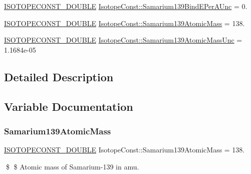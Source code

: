 \begin{DoxyCompactItemize}
\mbox{\hyperlink{group___isotope_const-_macros_ga8f45a7272ce02c0b4c65c44636ed719a}{I\+S\+O\+T\+O\+P\+E\+C\+O\+N\+S\+T\+\_\+\+D\+O\+U\+B\+LE}} \mbox{\hyperlink{group___isotope_const-_samarium-_sm139_gaa7116a8a73ff18141a5881150bd939eb}{Isotope\+Const\+::\+Samarium139\+Bind\+E\+Per\+A\+Unc}} = 0.
\item 
\mbox{\hyperlink{group___isotope_const-_macros_ga8f45a7272ce02c0b4c65c44636ed719a}{I\+S\+O\+T\+O\+P\+E\+C\+O\+N\+S\+T\+\_\+\+D\+O\+U\+B\+LE}} \mbox{\hyperlink{group___isotope_const-_samarium-_sm139_ga582a691def134e676c5132adc0b16564}{Isotope\+Const\+::\+Samarium139\+Atomic\+Mass}} = 138.
\item 
\mbox{\hyperlink{group___isotope_const-_macros_ga8f45a7272ce02c0b4c65c44636ed719a}{I\+S\+O\+T\+O\+P\+E\+C\+O\+N\+S\+T\+\_\+\+D\+O\+U\+B\+LE}} \mbox{\hyperlink{group___isotope_const-_samarium-_sm139_ga39a2565d2235af0a1166a1ebedc75ff8}{Isotope\+Const\+::\+Samarium139\+Atomic\+Mass\+Unc}} = 1.\+1684e-\/05
\end{DoxyCompactItemize}


\subsection{Detailed Description}


\subsection{Variable Documentation}
\mbox{\label{group___isotope_const-_samarium-_sm139_ga582a691def134e676c5132adc0b16564}} 
\subsubsection{\texorpdfstring{Samarium139\+Atomic\+Mass}{Samarium139AtomicMass}}
{\footnotesize\ttfamily \mbox{\hyperlink{group___isotope_const-_macros_ga8f45a7272ce02c0b4c65c44636ed719a}{I\+S\+O\+T\+O\+P\+E\+C\+O\+N\+S\+T\+\_\+\+D\+O\+U\+B\+LE}} Isotope\+Const\+::\+Samarium139\+Atomic\+Mass = 138.}

\$ \$ Atomic mass of Samarium-\/139 in amu. \mbox{\label{group___isotope_const-_samarium-_sm139_ga39a2565d2235af0a1166a1ebedc75ff8}} 
